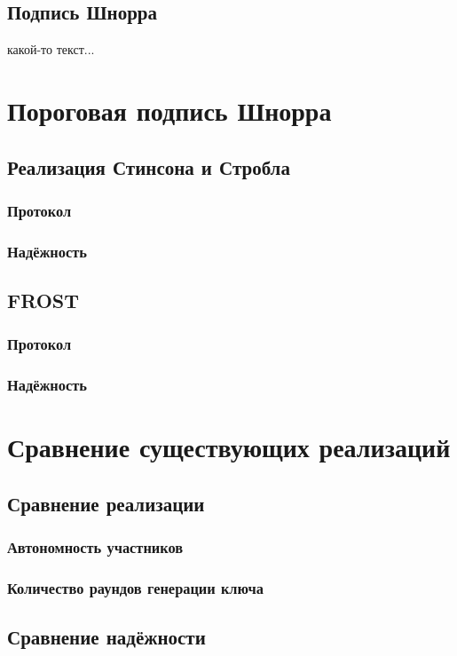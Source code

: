 \begin{enumerate}
\end{enumerate}


\section{Подпись Шнорра}

какой-то текст...

\chapter{Пороговая подпись Шнорра}
\section{Реализация Стинсона и Стробла}
\subsection{Протокол}
\subsection{Надёжность}
\section{FROST}
\subsection{Протокол}
\subsection{Надёжность}
\chapter{Сравнение существующих реализаций}
\section{Сравнение реализации}
\subsection{Автономность участников}
\subsection{Количество раундов генерации ключа}
\section{Сравнение надёжности}